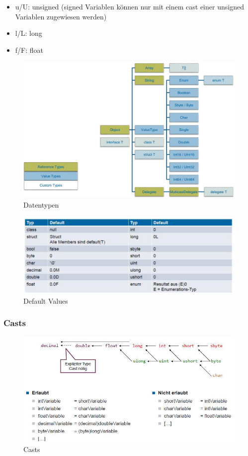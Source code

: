 \documentclass[
a4paper,
oneside,
10pt,
fleqn,
headsepline,
toc=listofnumbered, 
bibliography=totocnumbered]{scrartcl}
\begin{document}
\begin{itemize}
	\item u/U: unsigned (signed Variablen können nur mit einem cast einer unsigned Variablen zugewiesen werden)
	\item l/L: long
	\item f/F: float
\end{itemize}
\begin{figure}[!ht]
	\centering
	\includegraphics[width=0.8\linewidth]{images/datatypes}
	\caption{Datentypen}
	\label{fig:datatypes}
\end{figure}

\begin{figure}[!ht]
	\centering
	\includegraphics[width=\linewidth]{images/default_values}
	\caption{Default Values}
	\label{fig:defaultvalues}
\end{figure}

\newpage

\subsubsection{Casts}
\begin{figure}[!ht]
	\centering
	\includegraphics[width=\linewidth]{images/casts}
	\caption{Casts}
	\label{fig:casts}
\end{figure}
\end{document}
